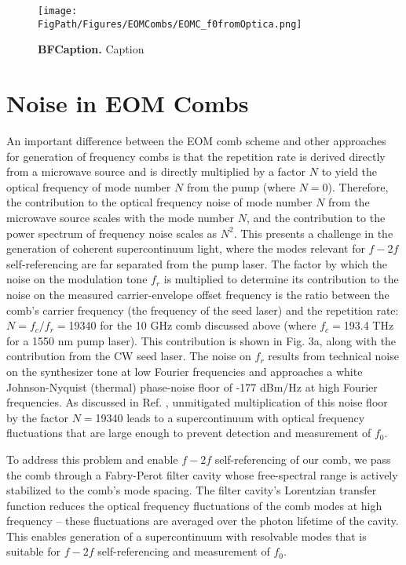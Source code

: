 \begin{figure}[htpb]
	\begin{center}
		\texttt{[image: \\FigPath/Figures/EOMCombs/EOMC\_f0fromOptica.png]}
	\end{center}
	\caption[Figure Title]{\textbf{BFCaption.} Caption}
	\label{fig:PPConcept}
\end{figure} 



\section{Noise in EOM Combs}

An important difference between the EOM comb scheme and other approaches for generation of frequency combs is that the repetition rate is derived directly from a microwave source and is directly multiplied by a factor $N$ to yield the optical frequency of mode number $N$ from the pump (where $N=0$). Therefore, the contribution to the optical frequency noise of mode number $N$ from the microwave source scales with the mode number $N$, and the contribution to the power spectrum of frequency noise scales as $N^2$. This presents a challenge in the generation of coherent supercontinuum light, where the modes relevant for $f-2f$ self-referencing are far separated from the pump laser. The factor by which the noise on the modulation tone $f_r$ is multiplied to determine its contribution to the noise on the measured carrier-envelope offset frequency is the ratio between the comb’s carrier frequency (the frequency of the seed laser) and the repetition rate: $N=f_c/f_r=$19340 for the 10 GHz comb discussed above (where $f_c=$193.4 THz for a 1550 nm pump laser). This contribution is shown in Fig. 3a, along with the contribution from the CW seed laser. The noise on $f_r$ results from technical noise on the synthesizer tone at low Fourier frequencies and approaches a white Johnson-Nyquist (thermal) phase-noise floor of -177 dBm/Hz at high Fourier frequencies. As discussed in Ref. \cite{Beha2017}, unmitigated multiplication of this noise floor by the factor $N=$19340 leads to a supercontinuum with optical frequency fluctuations that are large enough to prevent detection and measurement of $f_0$. 

To address this problem and enable $f-2f$ self-referencing of our comb, we pass the comb through a Fabry-Perot filter cavity whose free-spectral range is actively stabilized to the comb’s mode spacing. The filter cavity’s Lorentzian transfer function reduces the optical frequency fluctuations of the comb modes at high frequency – these fluctuations are averaged over the photon lifetime of the cavity. This enables generation of a supercontinuum with resolvable modes that is suitable for $f-2f$ self-referencing and measurement of $f_0$. 

